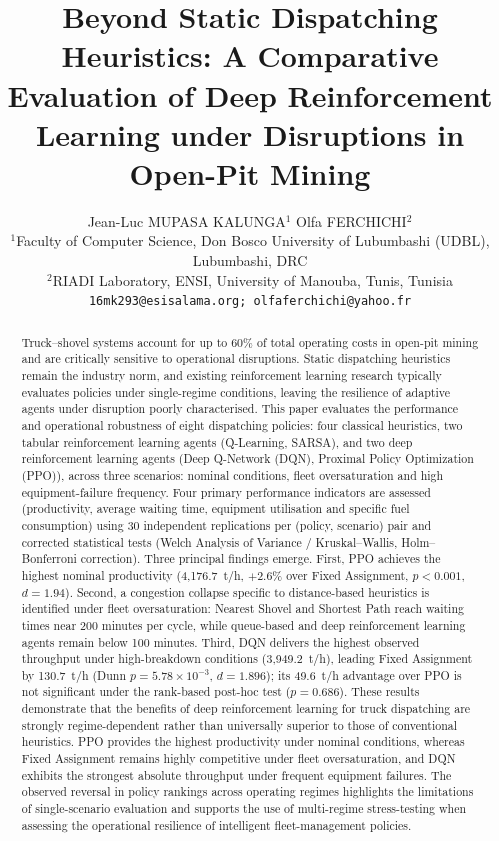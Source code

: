 \documentclass[11pt,a4paper]{article}
\title{\textbf{Beyond Static Dispatching Heuristics: A Comparative Evaluation of Deep Reinforcement Learning under Disruptions in Open-Pit Mining}}
\author{%
\begin{tabular}{c}
Jean-Luc MUPASA KALUNGA$^{1}$ \qquad Olfa FERCHICHI$^{2}$\\[0.5em]
{\small $^{1}$Faculty of Computer Science, Don Bosco University of Lubumbashi (UDBL), Lubumbashi, DRC}\\
{\small $^{2}$RIADI Laboratory, ENSI, University of Manouba, Tunis, Tunisia}\\[0.3em]
{\small\texttt{16mk293@esisalama.org; olfaferchichi@yahoo.fr}}
\end{tabular}%
}
\date{} %
\begin{document}
\maketitle

\begin{abstract}
Truck--shovel systems account for up to 60\% of total operating costs in open-pit mining and are critically
sensitive to operational disruptions. Static dispatching heuristics remain the industry norm, and existing
reinforcement learning research typically evaluates policies under single-regime conditions, leaving the
resilience of adaptive agents under disruption poorly characterised.  This paper evaluates the performance and
operational robustness of eight dispatching policies: four classical heuristics, two tabular reinforcement
learning agents (Q-Learning, SARSA), and two deep reinforcement learning agents (Deep Q-Network (DQN),
Proximal Policy Optimization (PPO)), across three scenarios: nominal conditions, fleet oversaturation and high
equipment-failure frequency. Four primary performance indicators are assessed (productivity, average waiting time, 
equipment utilisation and specific fuel consumption) using 30 independent replications per (policy, scenario)
pair and corrected statistical tests (Welch Analysis of Variance / Kruskal--Wallis, Holm--Bonferroni correction).  Three principal 
findings emerge. First, PPO achieves the highest nominal productivity (4,176.7~t/h, $+2.6\%$ over Fixed Assignment, 
$p < 0.001$, $d=1.94$). Second, a congestion collapse specific to distance-based heuristics is identified under
fleet oversaturation: Nearest Shovel and Shortest Path reach waiting times near 200 minutes per cycle, while
queue-based and deep reinforcement learning agents remain below 100 minutes.  Third, DQN delivers the highest
observed throughput under high-breakdown conditions (3,949.2~t/h), leading Fixed Assignment by 130.7~t/h (Dunn $p=5.78\times10^{-3}$, $d=1.896$); its 49.6~t/h advantage over PPO is not significant under the rank-based post-hoc test ($p=0.686$).  These results demonstrate that the benefits of deep reinforcement learning for truck
dispatching are strongly regime-dependent rather than universally superior to those of conventional heuristics. 
PPO provides the highest productivity under nominal conditions, whereas Fixed Assignment remains highly competitive 
under fleet oversaturation, and DQN exhibits the strongest absolute throughput under frequent equipment failures.
The observed reversal in policy rankings across operating regimes highlights the limitations of single-scenario 
evaluation and supports the use of multi-regime stress-testing when assessing the operational resilience of 
intelligent fleet-management policies.
\end{abstract}
\end{document}
